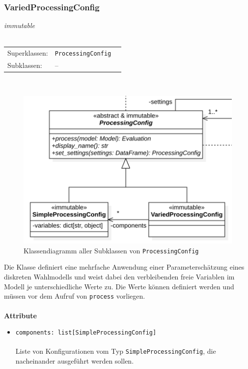 \documentclass{article}
\begin{document}
\subsubsection*{\large{\textbf{VariedProcessingConfig}\label{cls:VariedProcessingConfig}}}
\textit{\flqq{}immutable\frqq}\normalsize\\\\
\begin{tabular}{lll}
 Superklassen: & \texttt{ProcessingConfig}\\
 Subklassen: & --
\end{tabular}\\
\begin{figure}[H]%
    \centering
    \includegraphics[width=13cm]{entwurf/Entwurf_dokument/img/cls/model/ProcessingConfigs.png}
    \caption{Klassendiagramm aller Subklassen von \texttt{ProcessingConfig}}
\end{figure}

Die Klasse definiert eine mehrfache Anwendung einer Parameterschätzung eines diskreten Wahlmodells und weist dabei den verbleibenden freie Variablen im Modell je unterschiedliche Werte zu. Die Werte können definiert werden und müssen vor dem Aufruf von \texttt{process} vorliegen.
\\\\

\textbf{Attribute}
\begin{itemize}\setlength\itemsep{3em}
\item \texttt{components: list[SimpleProcessingConfig]}\\\\
Liste von Konfigurationen vom Typ \texttt{SimpleProcessingConfig}, die nacheinander ausgeführt werden sollen.
\\\\
\end{itemize}
\end{document}
